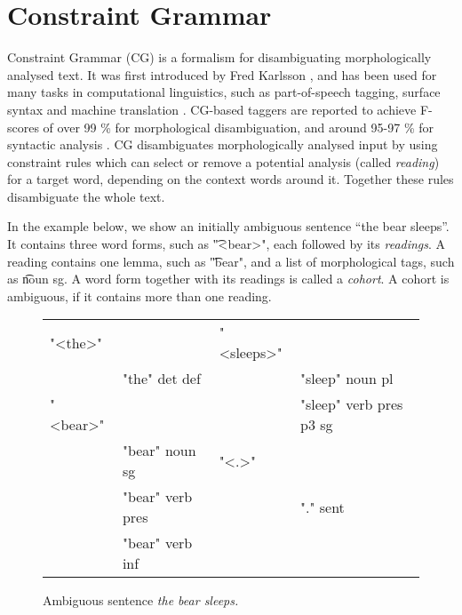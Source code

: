 \def\pmcfg{\textsc{pmcfg}}

\section{Constraint Grammar}
\label{sec:cg-intro}

Constraint Grammar (CG) is a formalism for 
disambiguating morphologically analysed text. 
It was first introduced by Fred Karlsson  
\cite{karlsson1990cgp,karlsson1995constraint}, and has been used for many tasks in
computational linguistics, such as part-of-speech tagging, surface syntax and
machine translation \cite{bick2011}.
CG-based taggers are reported to achieve F-scores of over 99 \% for morphological disambiguation, 
and around 95-97 \% for syntactic analysis \cite{bick2000palavras,bick2003hybridCG_PSG,bick2006spanish}.
CG disambiguates morphologically analysed input by using
constraint rules which can select or remove a potential analysis (called \emph{reading})
for a target word, depending on the context words around it. 
Together these rules disambiguate the whole text.


In the example below, we show an initially ambiguous sentence ``the bear
sleeps''. 
It contains three word forms, such as \t{"<bear>"}, each followed by its \emph{readings}.
A reading contains one lemma, such as \t{"bear"}, and a list of morphological tags, such as \t{noun sg}.
A word form together with its readings is called a \emph{cohort}. A cohort is ambiguous, if it contains more than one reading.

\begin{figure}[h]
\centering
\ttfamily
\begin{tabular}{p{0.6cm} l  p{0.6cm} l}
"<the>"  &                & "<sleeps>"        \\
    & "the" det def       &     & "sleep" noun pl \\
"<bear>" &                &     & "sleep" verb pres p3 sg \\
    & "bear" noun sg      & "<.>"                   \\
    & "bear" verb pres    &     & "." sent          \\
    & "bear" verb inf \\
\end{tabular}
\label{fig:theBearSleeps}
\caption{Ambiguous sentence {\em the bear sleeps.}}
\end{figure}


